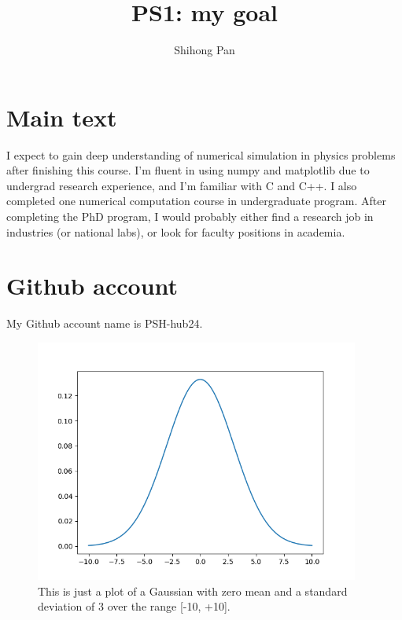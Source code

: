 \documentclass[11pt]{article}
\title{PS1: my goal}
\author{Shihong Pan}
\begin{document}
\maketitle


\section{Main text}
\label{sec:main}

I expect to gain deep understanding of numerical simulation in physics problems after finishing this course. I'm fluent in using numpy and matplotlib due to undergrad research experience, and  I'm familiar with C and C++. I also completed one numerical computation course in undergraduate program. After completing the PhD program, I would probably either find a research job in industries (or national labs), or look for faculty positions in academia.

\section{Github account}

My Github account name is PSH-hub24.


\begin{figure}[b!]
\centering
\includegraphics[width=0.95\textwidth]{gaussian.png}
\caption{ \label{fig:example} This is just a plot of a Gaussian with zero mean and a standard deviation of 3 over the range [-10, +10].}
\end{figure}
  



\end{document}
